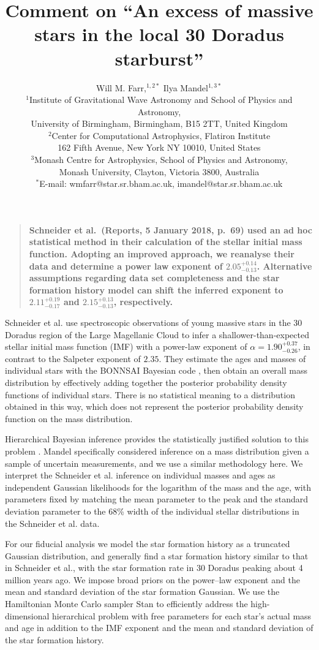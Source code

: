 \documentclass[12pt]{article}
\title{Comment on ``An excess of massive stars in the local 30 Doradus starburst''}
\author{Will M. Farr,$^{1,2\ast}$ Ilya Mandel$^{1,3\ast}$\\
\normalsize{$^1$Institute of Gravitational Wave Astronomy and School of Physics and Astronomy,}\\
\normalsize{University of Birmingham, Birmingham, B15 2TT, United Kingdom}\\
\normalsize{$^2$Center for Computational Astrophysics, Flatiron Institute}\\
\normalsize{162 Fifth Avenue, New York NY 10010, United States} \\
\normalsize{$^3$Monash Centre for Astrophysics, School of Physics and Astronomy,}\\
\normalsize{Monash University, Clayton, Victoria 3800, Australia}\\
\normalsize{$^\ast$E-mail: wmfarr@star.sr.bham.ac.uk, imandel@star.sr.bham.ac.uk}
}
\date{}
\newenvironment{sciabstract}{%
\begin{quote} \bf}
{\end{quote}}
\newcommand{\onesigrange}[3]{\ensuremath{#1^{+#2}_{-#3}}}
\newcommand{\alpharangeone}{\onesigrange{2.05}{0.14}{0.13}}
\newcommand{\alpharangethree}{\onesigrange{2.11}{0.19}{0.17}}
\newcommand{\alpharangefour}{\onesigrange{2.15}{0.13}{0.13}}
\begin{document}

\baselineskip24pt


\maketitle



\begin{sciabstract}
Schneider et al.~(Reports, 5 January 2018, p.~69) used an ad hoc statistical method in their calculation of the stellar initial mass function. Adopting an improved approach, we reanalyse their data and determine a power law exponent of $\alpharangeone$. Alternative assumptions regarding data set completeness and the star formation history model can shift the inferred exponent to $\alpharangethree$ and $\alpharangefour$, respectively.
\end{sciabstract}

Schneider et al.\cite{Schneider:2018} use spectroscopic observations of young massive stars in
the 30 Doradus region of the Large Magellanic Cloud to infer a
shallower-than-expected stellar initial mass function (IMF) with a power-law exponent of $\alpha=1.90^{+0.37}_{-0.26}$, in contrast to the Salpeter exponent of $2.35$\cite{Salpeter:1955}.  They estimate the ages and masses of individual
stars with the BONNSAI Bayesian code \cite{Schneider:2017}, then obtain
an overall mass distribution by effectively adding together the posterior
probability density functions of individual stars.  There is no statistical
meaning to a distribution obtained in this way, which does not represent the
posterior probability density function on the mass distribution.

Hierarchical Bayesian inference provides the statistically justified solution to
this problem \cite{Hogg:2010}.  Mandel\cite{Mandel:2010stat} specifically considered
inference on a mass distribution given a sample of uncertain measurements, and
we use a similar methodology here.  We interpret the Schneider et al.\cite{Schneider:2018}
inference on individual masses and ages as independent Gaussian likelihoods for
the logarithm of the mass and the age, with parameters fixed by matching the mean
parameter to the peak and the standard deviation parameter to the 68\% width of
the individual stellar distributions in the Schneider et al.\cite{Schneider:2018} data.

For our fiducial analysis we model the star formation history as a truncated Gaussian distribution, and
generally find a star formation history similar to that in Schneider et al.\cite{Schneider:2018}, with
the star formation rate in 30 Doradus peaking about 4 million years ago.  We impose broad priors
on the power--law exponent and the mean and standard deviation of the star
formation Gaussian.    We use the Hamiltonian Monte Carlo sampler Stan
\cite{STAN} to efficiently address the high-dimensional hierarchical problem
with free parameters for each star's actual mass and age in addition to
the IMF exponent and the mean and standard deviation of the star formation
history.
\end{document}

